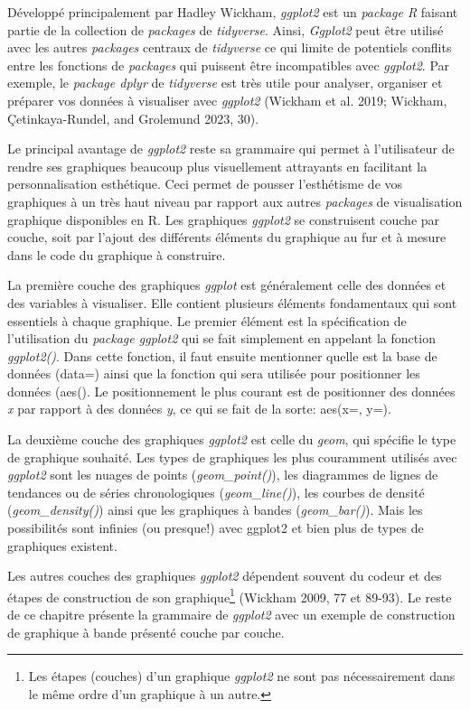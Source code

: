 \documentclass[
  letterpaper,
]{scrbook}
\begin{document}
Développé principalement par Hadley Wickham, \emph{ggplot2} est un
\emph{package R} faisant partie de la collection de \emph{packages} de
\emph{tidyverse}. Ainsi, \emph{Ggplot2} peut être utilisé avec les
autres \emph{packages} centraux de \emph{tidyverse} ce qui limite de
potentiels conflits entre les fonctions de \emph{packages} qui puissent
être incompatibles avec \emph{ggplot2}. Par exemple, le \emph{package
dplyr} de \emph{tidyverse} est très utile pour analyser, organiser et
préparer vos données à visualiser avec \emph{ggplot2} (Wickham et al.
2019; Wickham, Çetinkaya-Rundel, and Grolemund 2023, 30).

Le principal avantage de \emph{ggplot2} reste sa grammaire qui permet à
l'utilisateur de rendre ses graphiques beaucoup plus visuellement
attrayants en facilitant la personnalisation esthétique. Ceci permet de
pousser l'esthétisme de vos graphiques à un très haut niveau par rapport
aux autres \emph{packages} de visualisation graphique disponibles en R.
Les graphiques \emph{ggplot2} se construisent couche par couche, soit
par l'ajout des différents éléments du graphique au fur et à mesure dans
le code du graphique à construire.

La première couche des graphiques \emph{ggplot} est généralement celle
des données et des variables à visualiser. Elle contient plusieurs
éléments fondamentaux qui sont essentiels à chaque graphique. Le premier
élément est la spécification de l'utilisation du \emph{package ggplot2}
qui se fait simplement en appelant la fonction \emph{ggplot2()}. Dans
cette fonction, il faut ensuite mentionner quelle est la base de données
(data=) ainsi que la fonction qui sera utilisée pour positionner les
données (aes(). Le positionnement le plus courant est de positionner des
données \emph{x} par rapport à des données \emph{y}, ce qui se fait de
la sorte: aes(x=, y=).

La deuxième couche des graphiques \emph{ggplot2} est celle du
\emph{geom}, qui spécifie le type de graphique souhaité. Les types de
graphiques les plus couramment utilisés avec \emph{ggplot2} sont les
nuages de points (\emph{geom\_point()}), les diagrammes de lignes de
tendances ou de séries chronologiques (\emph{geom\_line()}), les courbes
de densité (\emph{geom\_density()}) ainsi que les graphiques à bandes
(\emph{geom\_bar()}). Mais les possibilités sont infinies (ou presque!)
avec ggplot2 et bien plus de types de graphiques existent.

Les autres couches des graphiques \emph{ggplot2} dépendent souvent du
codeur et des étapes de construction de son graphique\footnote{Les
  étapes (couches) d'un graphique \emph{ggplot2} ne sont pas
  nécessairement dans le même ordre d'un graphique à un autre.} (Wickham
2009, 77 et 89-93). Le reste de ce chapitre présente la grammaire de
\emph{ggplot2} avec un exemple de construction de graphique à bande
présenté couche par couche.
\end{document}

